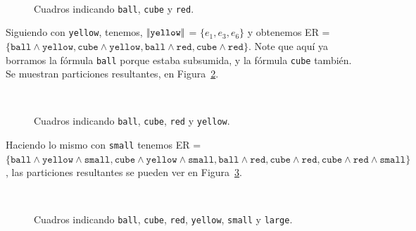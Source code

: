 \begin{figure}[ht]
\begin{center}
\\[0pt]
\caption{Cuadros indicando \texttt{ball}, \texttt{cube} y \texttt{red}.}
\label{fig-modelo9}
\end{center}
\end{figure}
%
Siguiendo con \texttt{yellow}, tenemos, $|\!|\texttt{yellow}|\!|$ = $\{e_1, e_3, e_6\}$ y obtenemos ER = $\{\texttt{ball} \wedge \texttt{yellow}, 
\texttt{cube} \wedge \texttt{yellow}, \texttt{ball} \wedge \texttt{red}, \texttt{cube} \wedge \texttt{red}\}$. 
Note que aqu\'i ya borramos la f\'ormula \texttt{ball} porque estaba subsumida, y la f\'ormula \texttt{cube} tambi\'en. 
Se muestran particiones resultantes, en Figura~\ref{fig-modelo10}.

\begin{figure}[ht]
\begin{center}
\\[0pt]
\caption{Cuadros indicando \texttt{ball}, \texttt{cube}, \texttt{red} y \texttt{yellow}.}
\label{fig-modelo10}
\end{center}
\end{figure}

Haciendo lo mismo con \texttt{small} tenemos ER = $\{\texttt{ball} \wedge \texttt{yellow} \wedge \texttt{small}, \texttt{cube} \wedge \texttt{yellow} \wedge \texttt{small}, \texttt{ball} \wedge \texttt{red}, \texttt{cube} \wedge \texttt{red}, \texttt{cube} \wedge \texttt{red} \wedge \texttt{small}\}$, las particiones resultantes se pueden ver en Figura~\ref{fig-modelo11}.

%

\begin{figure}[ht]
\begin{center}
\\[0pt]
\caption{Cuadros indicando \texttt{ball}, \texttt{cube}, \texttt{red}, \texttt{yellow}, \texttt{small} y \texttt{large}.}
\label{fig-modelo11}
\end{center}
\end{figure}

